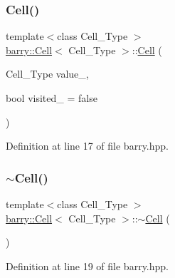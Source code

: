 \mbox{\label{classbarry_1_1_cell_ae315476489673759fad689eb2f8ce952}} 
\subsubsection{\texorpdfstring{Cell()}{Cell()}\hspace{0.1cm}{\footnotesize\ttfamily [2/5]}}
{\footnotesize\ttfamily template$<$class Cell\+\_\+\+Type $>$ \\
\hyperlink{classbarry_1_1_cell}{barry\+::\+Cell}$<$ Cell\+\_\+\+Type $>$\+::\hyperlink{classbarry_1_1_cell}{Cell} (\begin{DoxyParamCaption}\item[{Cell\+\_\+\+Type}]{value\+\_\+,  }\item[{bool}]{visited\+\_\+ = {\ttfamily false} }\end{DoxyParamCaption})\hspace{0.3cm}{\ttfamily [inline]}}



Definition at line 17 of file barry.\+hpp.

\mbox{\label{classbarry_1_1_cell_a2500924b447d4d881916749041974d81}} 
\subsubsection{\texorpdfstring{$\sim$\+Cell()}{~Cell()}}
{\footnotesize\ttfamily template$<$class Cell\+\_\+\+Type $>$ \\
\hyperlink{classbarry_1_1_cell}{barry\+::\+Cell}$<$ Cell\+\_\+\+Type $>$\+::$\sim$\hyperlink{classbarry_1_1_cell}{Cell} (\begin{DoxyParamCaption}{ }\end{DoxyParamCaption})\hspace{0.3cm}{\ttfamily [inline]}}



Definition at line 19 of file barry.\+hpp.

\mbox{\label{classbarry_1_1_cell_a5768e9495f6d7570fdbadf362bc46e3a}} 
